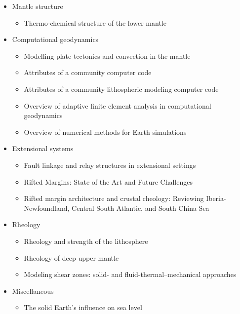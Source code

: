 \begin{itemize}
\item Mantle structure
   \begin{itemize}
   \item Thermo-chemical structure of the lower mantle \cite{dett07}
   \end{itemize}


\item Computational geodynamics
   \begin{itemize}
   \item Modelling plate tectonics and convection in the mantle \cite{mogz00}
   \item Attributes of a community computer code \cite{comc15}
   \item Attributes of a community lithospheric modeling computer code \cite{comc15}
   \item Overview of adaptive finite element analysis in computational geodynamics \cite{masm13}
   \item Overview of numerical methods for Earth simulations \cite{momd01}
   \end{itemize}

\item Extensional systems
   \begin{itemize}
   \item Fault linkage and relay structures in extensional settings \cite{foro16}
   \item Rifted Margins: State of the Art and Future Challenges \cite{pema19}\\
   \item Rifted margin architecture and crustal rheology: Reviewing
Iberia-Newfoundland, Central South Atlantic, and South China Sea \cite{brhc17}
   \end{itemize}

\item Rheology 
   \begin{itemize}
   \item Rheology and strength of the lithosphere \cite{kirb83,buro11}
   \item Rheology of deep upper mantle \cite{kara10}
   \item Modeling shear zones: solid- and fluid-thermal–mechanical approaches \cite{reyu03}
   \end{itemize}

\item Miscellaneous
   \begin{itemize}
   \item The solid Earth’s influence on sea level \cite{conr13}  
   \end{itemize}



\end{itemize}

